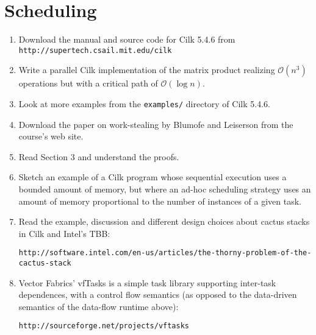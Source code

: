 \documentclass[a4paper]{article}
\begin{document}
\section{Scheduling}

\begin{enumerate}
\item Download the manual and source code for Cilk 5.4.6 from
  \texttt{http://supertech.csail.mit.edu/cilk}

\item Write a parallel Cilk implementation of the matrix product
  realizing $\mathcal{O}(n^3)$ operations but with a critical path of
  $\mathcal{O}(\log n)$.

\item Look at more examples from the \texttt{examples/} directory of
  Cilk 5.4.6.

\item Download the paper on work-stealing by Blumofe and Leiserson
  from the course's web site.

\item Read Section 3 and understand the proofs.

\item Sketch an example of a Cilk program whose sequential execution
  uses a bounded amount of memory, but where an ad-hoc scheduling
  strategy uses an amount of memory proportional to the number of
  instances of a given task.

\item Read the example, discussion and different design choices about
  cactus stacks in Cilk and Intel's TBB:

  \texttt{http://software.intel.com/en-us/articles/the-thorny-problem-of-the-cactus-stack}

\item Vector Fabrics' vfTasks is a simple task library supporting
  inter-task dependences, with a control flow semantics (as opposed to
  the data-driven semantics of the data-flow runtime above):

  \texttt{http://sourceforge.net/projects/vftasks}
\end{enumerate}
\end{document}
